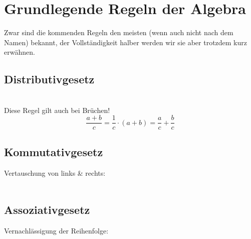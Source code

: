 \section{Grundlegende Regeln der Algebra}
	Zwar sind die kommenden Regeln den meisten (wenn auch nicht nach dem Namen)
	bekannt, der Vollständigkeit halber werden wir sie aber trotzdem kurz erwähnen.
	
	\subsection{Distributivgesetz}
		\( \) %
		\formel{\[a \cdot (b+c) = a \cdot b + a \cdot c\]}
		\\ \\
		Diese Regel gilt auch bei Brüchen!
		\[\frac{a+b}{c}=\frac{1}{c}\cdot (a+b)=\frac{a}{c}+\frac{b}{c}\]
	
	\subsection{Kommutativgesetz}
		Vertauschung von links \& rechts:
		\\ \\
		\formel{\[a+b=b+a,\ bzw\ a\cdot b=b\cdot a\]}
	
	\subsection{Assoziativgesetz}
		Vernachlässigung der Reihenfolge:
		\\ \\
		\formel{\[(a+b)+c=a+(b+c),\ bzw\ (a\cdot b)\cdot c=a\cdot (b\cdot c)\]}